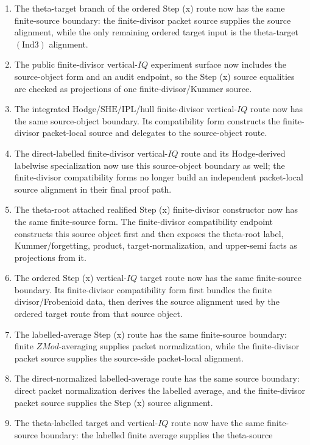 \documentclass[11pt]{article}
\newcommand{\Ind}{\ensuremath{\mathrm{Ind}}}
\newcommand{\SHE}{\ensuremath{\mathrm{SHE}}}
\newcommand{\IPL}{\ensuremath{\mathrm{IPL}}}
\theoremstyle{plain}
\theoremstyle{definition}
\theoremstyle{remark}
\begin{document}
\begin{enumerate}
  endpoint.
\item The theta-target branch of the ordered Step (x) route now has the same
  finite-source boundary: the finite-divisor packet source supplies the source
  alignment, while the only remaining ordered target input is the
  theta-target \((\Ind3)\) alignment.
\item The public finite-divisor vertical-\(IQ\) experiment surface now includes
  the source-object form and an audit endpoint, so the Step (x) source
  equalities are checked as projections of one finite-divisor/Kummer source.
\item The integrated Hodge/\(\SHE/\IPL\)/hull finite-divisor vertical-\(IQ\)
  route now has the same source-object boundary.  Its compatibility form
  constructs the finite-divisor packet-local source and delegates to the
  source-object route.
\item The direct-labelled finite-divisor vertical-\(IQ\) route and its
  Hodge-derived labelwise specialization now use this source-object boundary
  as well; the finite-divisor compatibility forms no longer build an
  independent packet-local source alignment in their final proof path.
\item The theta-root attached realified Step (x) finite-divisor constructor now
  has the same finite-source form.  The finite-divisor compatibility endpoint
  constructs this source object first and then exposes the theta-root label,
  Kummer/forgetting, product, target-normalization, and upper-semi facts as
  projections from it.
\item The ordered Step (x) vertical-\(IQ\) target route now has the same
  finite-source boundary.  Its finite-divisor compatibility form first bundles
  the finite divisor/Frobenioid data, then derives the source alignment used by
  the ordered target route from that source object.
\item The labelled-average Step (x) route has the same finite-source boundary:
  finite \(ZMod\)-averaging supplies packet normalization, while the
  finite-divisor packet source supplies the source-side packet-local
  alignment.
\item The direct-normalized labelled-average route has the same source
  boundary: direct packet normalization derives the labelled average, and the
  finite-divisor packet source supplies the Step (x) source alignment.
\item The theta-labelled target and vertical-\(IQ\) route now have the same
  finite-source boundary: the labelled finite average supplies the theta-source

\end{enumerate}
\end{document}
